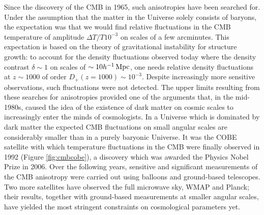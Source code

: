 \documentclass[a4paper,11pt]{article}
\begin{document}
{\noindent}Since the discovery of the CMB in 1965, such anisotropies have been searched for. Under the assumption that the matter in the Universe solely consists of baryons, the expectation was that we would find relative fluctuations in the CMB temperature of amplitude $\Delta T/T10^{-3}$ on scales of a few arcminutes. This expectation is based on the theory of gravitational instability for structure growth: to account for the density fluctuations observed today where the density contrast $\delta\sim1$ on scales of $\sim10h^{-1}\,{\rm Mpc}$, one needs relative density fluctuations at $z\sim1000$ of order $D_+(z=1000)\sim10^{-3}$. Despite increasingly more sensitive observations, such fluctuations were not detected. The upper limits resulting from these searches for anisotropies provided one of the arguments that, in the mid-1980s, caused the idea of the existence of dark matter on cosmic scales to increasingly enter the minds of cosmologists. In a Universe which is dominated by dark matter the expected CMB fluctuations on small angular scales are considerably smaller than in a purely baryonic Universe. It was the COBE satellite with which temperature fluctuations in the CMB were finally observed in 1992 (Figure \ref{fig:cmbcobe}), a discovery which was awarded the Physics Nobel Prize in 2006. Over the following years, sensitive and significant measurements of the CMB anisotropy were carried out using balloons and ground-based telescopes. Two more satellites have observed the full microwave sky, WMAP and Planck; their results, together with ground-based measurements at smaller angular scales, have yielded the most stringent constraints on cosmological parameters yet.
\end{document}
